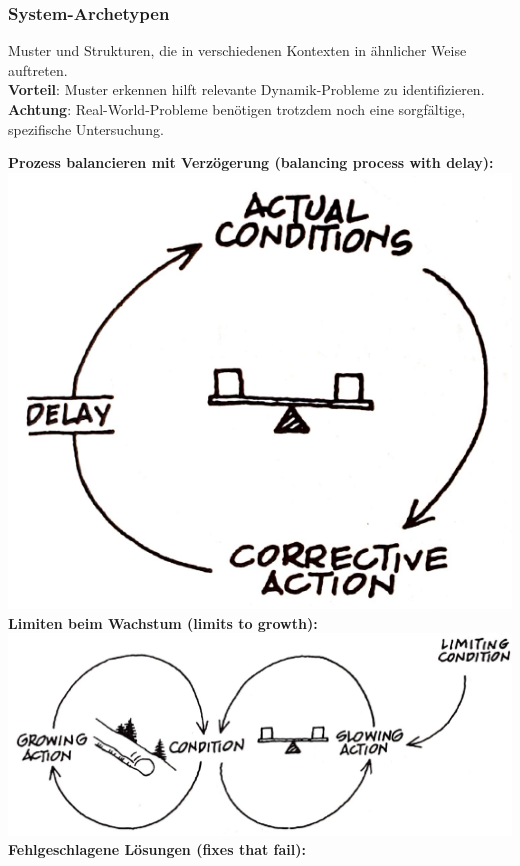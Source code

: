 \subsubsection{System-Archetypen}
Muster und Strukturen, die in verschiedenen Kontexten in ähnlicher Weise auftreten.\\
\textbf{Vorteil}: Muster erkennen hilft relevante Dynamik-Probleme zu identifizieren.\\
\textbf{Achtung}: Real-World-Probleme benötigen trotzdem noch eine sorgfältige, spezifische Untersuchung.\\
\begin{multicols}{3}
	\textbf{Prozess balancieren mit Verzögerung (balancing process with delay):}\\
	\includegraphics[width=0.8\linewidth]{pictures/archetype1}\\
	\vfill\null
	\columnbreak
	\textbf{Limiten beim Wachstum (limits to growth):}\\
	\includegraphics[width=\linewidth]{pictures/archetype2}\\
	\vfill\null
	\columnbreak
	\textbf{Fehlgeschlagene Lösungen (fixes that fail):}\\

\end{multicols}
